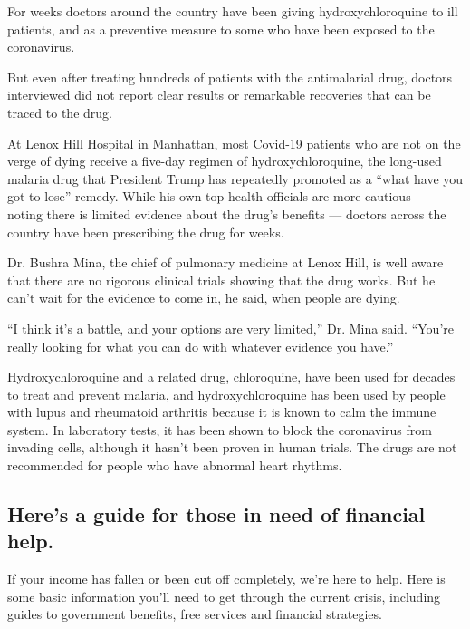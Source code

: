 For weeks doctors around the country have been giving hydroxychloroquine
to ill patients, and as a preventive measure to some who have been
exposed to the coronavirus.

But even after treating hundreds of patients with the antimalarial drug,
doctors interviewed did not report clear results or remarkable
recoveries that can be traced to the drug.

At Lenox Hill Hospital in Manhattan, most
\href{https://www.nytimes3xbfgragh.onion/news-event/coronavirus?action=click\&pgtype=Article\&state=default\&module=STYLN_coronahub\&variant=show\&region=header\&context=menu}{Covid-19}
patients who are not on the verge of dying receive a five-day regimen of
hydroxychloroquine, the long-used malaria drug that President Trump has
repeatedly promoted as a ``what have you got to lose'' remedy. While his
own top health officials are more cautious --- noting there is limited
evidence about the drug's benefits --- doctors across the country have
been prescribing the drug for weeks.

Dr. Bushra Mina, the chief of pulmonary medicine at Lenox Hill, is well
aware that there are no rigorous clinical trials showing that the drug
works. But he can't wait for the evidence to come in, he said, when
people are dying.

``I think it's a battle, and your options are very limited,'' Dr. Mina
said. ``You're really looking for what you can do with whatever evidence
you have.''

Hydroxychloroquine and a related drug, chloroquine, have been used for
decades to treat and prevent malaria, and hydroxychloroquine has been
used by people with lupus and rheumatoid arthritis because it is known
to calm the immune system. In laboratory tests, it has been shown to
block the coronavirus from invading cells, although it hasn't been
proven in human trials. The drugs are not recommended for people who
have abnormal heart rhythms.

\hypertarget{heres-a-guide-for-those-in-need-of-financial-help}{%
\subsection{Here's a guide for those in need of financial
help.}\label{heres-a-guide-for-those-in-need-of-financial-help}}

If your income has fallen or been cut off completely, we're here to
help. Here is some basic information you'll need to get through the
current crisis, including guides to government benefits, free services
and financial strategies.

